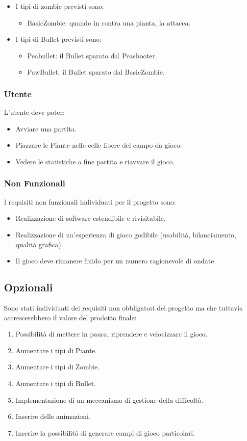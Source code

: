 \begin{itemize}
    \item I tipi di zombie previsti sono:
    \begin{itemize}
        \item BasicZombie: quando in contra una pianta, la attacca.
    \end{itemize}
    \item I tipi di Bullet previsti sono:
    \begin{itemize}
        \item Peabullet: il Bullet sparato dal Peashooter.
        \item PawBullet: il Bullet sparato dal BasicZombie.
    \end{itemize}
\end{itemize}

\subsubsection{Utente}
L'utente deve poter:
\begin{itemize}
    \item Avviare una partita.
    \item Piazzare le Piante nelle celle libere del campo da gioco.
    \item Vedere le statistiche a fine partita e riavvare il gioco.
\end{itemize}

\subsubsection{Non Funzionali}
I requisiti non funzionali individuati per il progetto sono:
\begin{itemize}
    \item Realizzazione di software estendibile e rivisitabile.
    \item Realizzazione di un'esperienza di gioco godibile (usabilità, bilanciamento, qualità grafica).
    \item Il gioco deve rimanere fluido per un numero ragionevole di ondate.
\end{itemize}

\subsection{Opzionali}
Sono stati individuati dei requisiti non obbligatori del progetto ma che tuttavia accrescerebbero il valore del prodotto finale:
\begin{enumerate}
    \item Possibilità di mettere in pausa, riprendere e velocizzare il gioco.
    \item Aumentare i tipi di Piante.
    \item Aumentare i tipi di Zombie.
    \item Aumentare i tipi di Bullet.
    \item Implementazione di un meccanismo di gestione della difficoltà.
    \item Inserire delle animazioni.
    \item Inserire la possibilità di generare campi di gioco particolari.
\end{enumerate}


